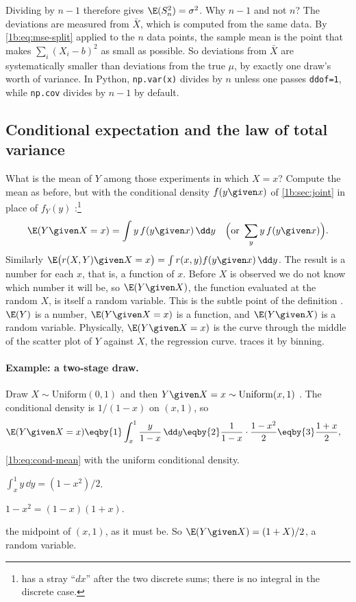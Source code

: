 Dividing by $n-1$ therefore gives $\E(S_n^2)=\sigma^2$. Why $n-1$ and not
$n$? The deviations are measured from $\bar X$, which is computed from the
same data. By \eqref{1b:eq:mse-split} applied to the $n$ data points, the
sample mean is the point that makes $\sum_i(X_i-b)^2$ as small as possible.
So deviations from $\bar X$ are systematically smaller than deviations from
the true $\mu$, by exactly one draw's worth of variance. In Python,
\texttt{np.var(x)} divides by $n$ unless one passes \texttt{ddof=1}, while
\texttt{np.cov} divides by $n-1$ by default.

\subsection{Conditional expectation and the law of total variance}

What is the mean of $Y$ among those experiments in which $X=x$? Compute the
mean as before, but with the conditional density $f(y\given x)$ of
\cref{1b:sec:joint} in place of $f_Y(y)$ :\footnote{ has a stray ``$dx$'' after the two
discrete sums; there is no integral in the discrete case.}
\begin{equation}
  \E(Y\given X=x)=\int y\,f(y\given x)\,\dd y
  \quad\Bigl(\text{or }\sum_y y\,f(y\given x)\Bigr).
  \label{1b:eq:cond-mean}
\end{equation}
Similarly
$\E\bigl(r(X,Y)\given X=x\bigr)=\int r(x,y)f(y\given x)\,\dd y$.
The result is a number for each $x$, that is, a function of $x$. Before $X$ is
observed we do not know which number it will be, so $\E(Y\given X)$, the
function evaluated at the random $X$, is itself a random variable. This is
the subtle point of the definition . $\E(Y)$ is a
number, $\E(Y\given X=x)$ is a function, and $\E(Y\given X)$ is a random
variable. Physically, $\E(Y\given X=x)$ is the curve through the middle of the
scatter plot of $Y$ against $X$, the regression curve. 
traces it by binning.

\paragraph{Example: a two-stage draw.}
Draw $X\sim\mathrm{Uniform}(0,1)$ and then $Y\given X=x\sim\mathrm{Uniform}(x,1)$
. The conditional density is $1/(1-x)$ on $(x,1)$, so
\begin{align*}
  \E(Y\given X=x)
  &\eqby{1} \int_x^1\frac{y}{1-x}\,\dd y
   \eqby{2} \frac{1}{1-x}\cdot\frac{1-x^2}{2}
   \eqby{3} \frac{1+x}{2} ,
\end{align*}
\begin{explain}
  \item \eqref{1b:eq:cond-mean} with the uniform conditional density.
  \item $\int_x^1y\,\dd y=(1-x^2)/2$.
  \item $1-x^2=(1-x)(1+x)$.
\end{explain}
the midpoint of $(x,1)$, as it must be. So $\E(Y\given X)=(1+X)/2$, a random
variable.

